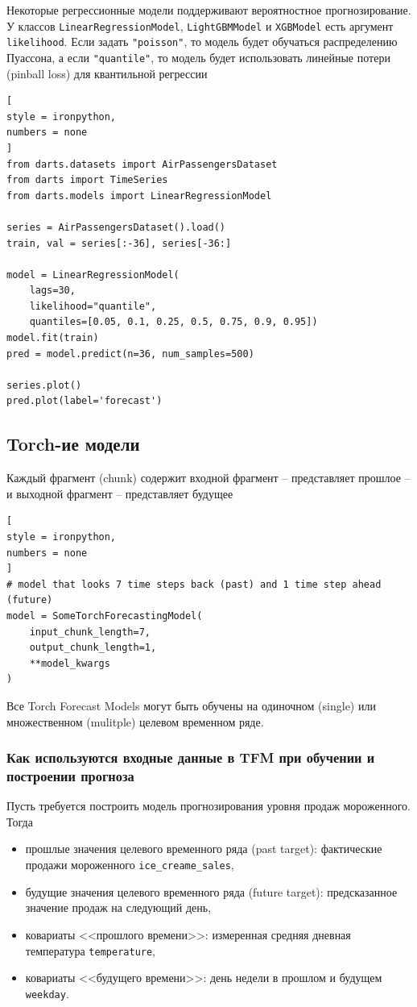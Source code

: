 \documentclass[%
	11pt,
	a4paper,
	utf8,
		]{article}
\begin{document}
Некоторые регрессионные модели поддерживают вероятностное прогнозирование. У классов \verb|LinearRegressionModel|, \verb|LightGBMModel| и \verb|XGBModel| есть аргумент \verb|likelihood|. Если задать \verb|"poisson"|, то модель будет обучаться распределению Пуассона, а если \verb|"quantile"|, то модель будет использовать линейные потери (pinball loss) для квантильной регрессии
\begin{lstlisting}[
style = ironpython,
numbers = none
]
from darts.datasets import AirPassengersDataset
from darts import TimeSeries
from darts.models import LinearRegressionModel

series = AirPassengersDataset().load()
train, val = series[:-36], series[-36:]

model = LinearRegressionModel(
    lags=30,
	likelihood="quantile",
	quantiles=[0.05, 0.1, 0.25, 0.5, 0.75, 0.9, 0.95])
model.fit(train)
pred = model.predict(n=36, num_samples=500)

series.plot()
pred.plot(label='forecast')
\end{lstlisting}

\subsection{Torch-ие модели}

Каждый фрагмент (chunk) содержит входной фрагмент -- представляет прошлое -- и выходной фрагмент -- представляет будущее
\begin{lstlisting}[
style = ironpython,
numbers = none
]
# model that looks 7 time steps back (past) and 1 time step ahead (future)
model = SomeTorchForecastingModel(
    input_chunk_length=7,
    output_chunk_length=1,
    **model_kwargs
)
\end{lstlisting}

Все Torch Forecast Models могут быть обучены на одиночном (single) или множественном (mulitple) целевом временном ряде.

\subsubsection{Как используются входные данные в TFM при обучении и построении прогноза}

Пусть требуется построить модель прогнозирования уровня продаж мороженного. Тогда
\begin{itemize}
	\item прошлые значения целевого временного ряда (past target): фактические продажи мороженного \verb|ice_creame_sales|,
	
	\item будущие значения целевого временного ряда (future target): предсказанное значение продаж на следующий день,
	
	\item ковариаты <<прошлого времени>>: измеренная средняя дневная температура \verb|temperature|,
	
	\item ковариаты <<будущего времени>>: день недели в прошлом и будущем \verb|weekday|.
\end{itemize}
\end{document}
